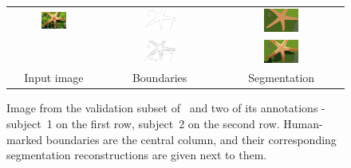 \begin{figure}[ht!]
\begin{center}
  \begin{tabular}{ c c c }
  \includegraphics[width=0.3\textwidth]{images/examples/starfish/starfish.png} &
  \includegraphics[width=0.3\textwidth,frame]{images/examples/starfish/starfish_bdry_coarse.png} &
  \includegraphics[width=0.3\textwidth]{images/examples/starfish/starfish_segm_coarse.png} \\
  &
  \includegraphics[width=0.3\textwidth,frame]{images/examples/starfish/starfish_bdry_detail.png} &
  \includegraphics[width=0.3\textwidth]{images/examples/starfish/starfish_segm_detail.png} \\
  Input image & Boundaries & Segmentation \\
  \end{tabular}
\end{center}
\caption{Image from the validation subset of~\cite{BSDS500resources} and two of its annotations - subject~1 on the first row, subject~2 on the second row. Human-marked boundaries are the central column, and their corresponding segmentation reconstructions are given next to them.}
\label{fig:BSDS-annotations}
\end{figure}

